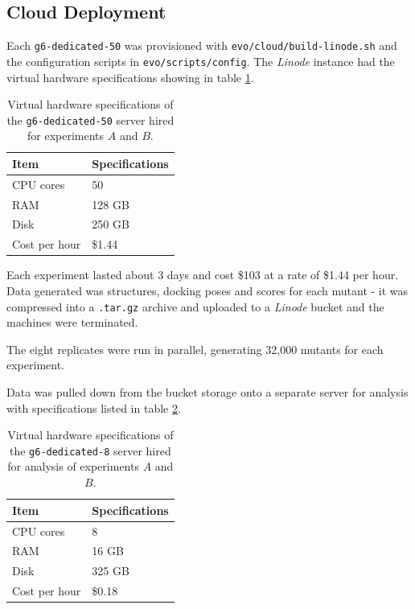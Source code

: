 \documentclass[16pt]{article}
\begin{document}
\subsection{Cloud Deployment \label{cloud}}
Each \texttt{g6-dedicated-50} was provisioned with \texttt{evo/cloud/build-linode.sh} and the configuration scripts in \texttt{evo/scripts/config}.
The \textit{Linode} instance had the virtual hardware specifications showing in table \ref{linode}.

\begin{table}
        \begin{center}
		\caption{\label{linode} Virtual hardware specifications of the \texttt{g6-dedicated-50} server hired for experiments $A$ and $B$.}
                \begin{tabular}{l|p{3cm}}
		\textbf{Item} & \textbf{Specifications} \\
                \hline
			CPU cores & 50 \\
			RAM & 128 GB \\
			Disk & 250 GB \\
			Cost per hour & \$1.44 \\
        \end{tabular}
        \end{center}
\end{table}

Each experiment lasted about 3 days and cost \$103 at a rate of \$1.44 per hour. 
Data generated was structures, docking poses and scores for each mutant - it was compressed into a \texttt{.tar.gz} archive and uploaded to a \textit{Linode} bucket and the machines were terminated.

The eight replicates were run in parallel, generating 32,000 mutants for each experiment.

Data was pulled down from the bucket storage onto a separate server for analysis with specifications listed in table \ref{analysis}.
\begin{table}
        \begin{center}
		\caption{\label{analysis} Virtual hardware specifications of the \texttt{g6-dedicated-8} server hired for analysis of experiments $A$ and $B$.}
                \begin{tabular}{l|p{3cm}}
		\textbf{Item} & \textbf{Specifications} \\
                \hline
			CPU cores & 8 \\
			RAM & 16 GB \\
			Disk & 325 GB \\
			Cost per hour & \$0.18 \\
        \end{tabular}
        \end{center}
\end{table}
\end{document}
